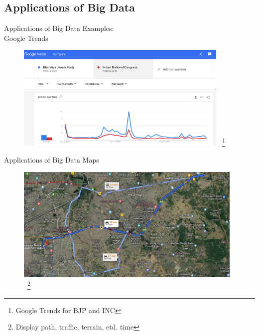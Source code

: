 \documentclass[pdf]{beamer}
\begin{document}
\subsection{Applications of Big Data}
\begin{frame}[fragile]{Applications of Big Data}
Examples: \\
Google Trends
	 \begin{figure}[ht]
	    \begin{center}
        		\includegraphics[height=2in]{1.png}
            ~\footnote{Google Trends for BJP and INC}
    \end{center}
    \end{figure}
\end{frame}
\begin{frame}[fragile]{Applications of Big Data}
Maps
	 \begin{figure}[ht]
	    \begin{center}
        		\includegraphics[height=2.2in]{2.png}
            ~\footnote{Display path, traffic, terrain, etd. time}
    \end{center}
    \end{figure}
\end{frame}
\end{document}
